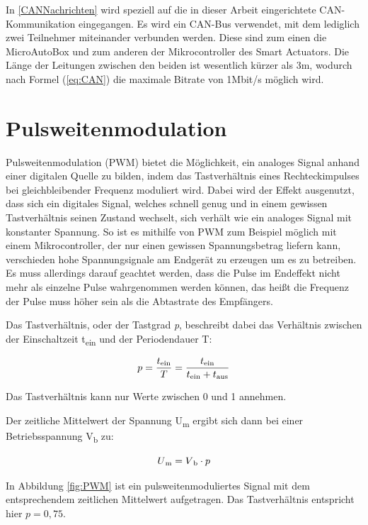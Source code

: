 In \autoref{CANNachrichten} wird speziell auf die in dieser Arbeit eingerichtete CAN-Kommunikation eingegangen. Es wird ein CAN-Bus verwendet, mit dem lediglich zwei Teilnehmer miteinander verbunden werden. Diese sind zum einen die MicroAutoBox und zum anderen der Mikrocontroller des Smart Actuators. Die Länge der Leitungen zwischen den beiden ist wesentlich kürzer als 3m, wodurch nach Formel (\ref{eq:CAN}) die maximale Bitrate von 1Mbit/s möglich wird.

\section{Pulsweitenmodulation} \label{sec:PWM_kap2}
Pulsweitenmodulation (PWM) bietet die Möglichkeit, ein analoges Signal anhand einer digitalen Quelle zu bilden, indem das Tastverhältnis eines Rechteckimpulses bei gleichbleibender Frequenz moduliert wird. Dabei wird der Effekt ausgenutzt, dass sich ein digitales Signal, welches schnell genug und in einem gewissen Tastverhältnis seinen Zustand wechselt, sich verhält wie ein analoges Signal mit konstanter Spannung. So ist es mithilfe von PWM zum Beispiel möglich mit einem Mikrocontroller, der nur einen gewissen Spannungsbetrag liefern kann, verschieden hohe Spannungsignale am Endgerät zu erzeugen um es zu betreiben. Es muss allerdings darauf geachtet werden, dass die Pulse im Endeffekt nicht mehr als einzelne Pulse wahrgenommen werden können, das heißt die Frequenz der Pulse muss höher sein als die Abtastrate des Empfängers.

Das Tastverhältnis, oder der Tastgrad \textit{p}, beschreibt dabei das Verhältnis zwischen der Einschaltzeit t\textsubscript{ein} und der Periodendauer T:

\begin{equation}
	p=\frac{t\textsubscript{ein}}{T} = \frac{t\textsubscript{ein}}{t\textsubscript{ein}+t\textsubscript{aus}}
\end{equation}

Das Tastverhältnis kann nur Werte zwischen 0 und 1 annehmen.

Der zeitliche Mittelwert der Spannung U\textsubscript{m} ergibt sich dann bei einer Betriebsspannung V\textsubscript{b} zu:

\begin{equation}
	U\textsubscript{m}=V\textsubscript{b}\cdot p
\end{equation}

In Abbildung \ref{fig:PWM} ist ein pulsweitenmoduliertes Signal mit dem entsprechendem zeitlichen Mittelwert aufgetragen. Das Tastverhältnis entspricht hier $p=0,75$.

